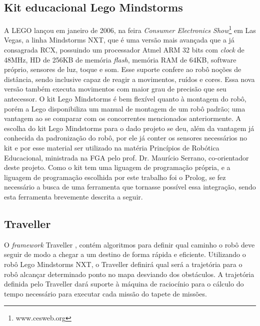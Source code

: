 \subsection{Kit educacional Lego Mindstorms}
A LEGO lançou em janeiro de 2006, na feira \textit{Consumer Electronics Show}\footnote{www.cesweb.org} em Las Vegas, a linha Mindstorms NXT, que é uma versão mais avançada que a já consagrada RCX, possuindo um processador Atmel ARM 32 bits com \textit{clock} de 48MHz, HD de 256KB de memória \textit{flash}, memória RAM de 64KB, software próprio, sensores de luz, toque e som. Esse suporte confere ao robô noções de distância, sendo inclusive capaz de reagir a movimentos, ruídos e cores. Essa nova versão também executa movimentos com maior grau de precisão que seu antecessor.
O kit Lego Mindstorms é bem flexível quanto à montagem do robô, porém a Lego disponibiliza um manual de montagem de um robô padrão; uma vantagem ao se comparar com os concorrentes mencionados anteriormente. 
A escolha do kit Lego Mindstorms para o dado projeto se deu, além da vantagem já conhecida da padronização do robô, por ele já conter os sensores necessários no kit e por esse material ser utilizado na matéria Princípios de Robótica Educacional, ministrada na FGA pelo prof. Dr. Maurício Serrano, co-orientador deste projeto. Como o kit tem uma liguagem de programação própria, e a liguagem de programação escolhida por este trabalho foi o Prolog, se fez necessário a busca de uma ferramenta que tornasse possível essa integração, sendo esta ferramenta brevemente descrita a seguir.  

\subsection{Traveller}
O \textit{framework} Traveller \cite{rinconframework}, contém algoritmos para definir qual caminho o robô deve seguir de modo a chegar a um destino de forma rápida e eficiente. Utilizando o robô Lego Mindstorms NXT, o Traveller definirá qual será a trajetória para o robô alcançar determinado ponto no mapa desviando dos obstáculos. A trajetória definida pelo Traveller dará suporte à máquina de raciocínio para o cálculo do tempo necessário para executar cada missão do tapete de missões.



